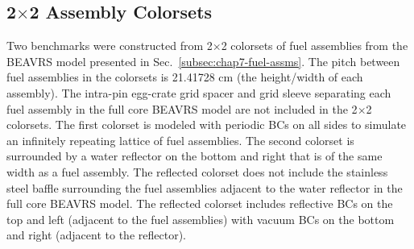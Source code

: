 \subsection{2$\times$2 Assembly Colorsets}
\label{subsec:chap7-2x2-colorsets}


Two benchmarks were constructed from 2$\times$2 colorsets of fuel assemblies from the \ac{BEAVRS} model presented in Sec.~\ref{subsec:chap7-fuel-assms}. The pitch between fuel assemblies in the colorsets is 21.41728 cm (the height/width of each assembly). The intra-pin egg-crate grid spacer and grid sleeve separating each fuel assembly in the full core \ac{BEAVRS} model are not included in the 2$\times$2 colorsets. The first colorset is modeled with periodic \acp{BC} on all sides to simulate an infinitely repeating lattice of fuel assemblies. The second colorset is surrounded by a water reflector on the bottom and right that is of the same width as a fuel assembly. The reflected colorset does not include the stainless steel baffle surrounding the fuel assemblies adjacent to the water reflector in the full core \ac{BEAVRS} model. The reflected colorset includes reflective \acp{BC} on the top and left (adjacent to the fuel assemblies) with vacuum \acp{BC} on the bottom and right (adjacent to the reflector).

